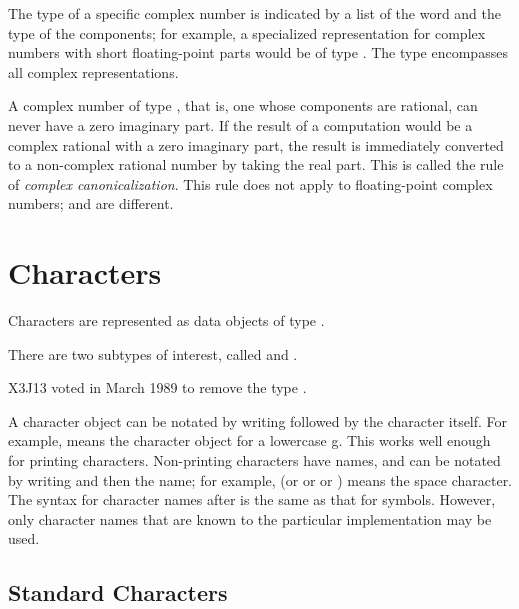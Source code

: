 {The type of a specific complex number is indicated by a list
of the word  and the type of the components; for example,
a specialized representation for complex numbers with short floating-point
parts would be of type .  The type 
encompasses all complex representations.

A complex number of type , that is, one whose
components are rational, can never have a zero imaginary part.
If the result of a computation would be a complex rational
with a zero imaginary part, the result is immediately
converted to a non-complex rational number by taking the
real part.  This is called the rule of {\it complex canonicalization}.
This rule does not apply to floating-point complex numbers;
 and  are different.

\goodbreak

\section{Characters}

Characters are represented as data objects of type .
\begin{obsolete}
There are two subtypes of interest,
called  and .
\end{obsolete}
\begin{newer}
X3J13 voted in March 1989  to remove the type .
\end{newer}

A character object can be notated by writing \cd{\#{\Xbackslash}} followed
by the character itself.  For example,  means the character
object for a lowercase g.  This works well enough for printing
characters.  Non-printing characters have names, and can be notated
by writing \cd{\#{\Xbackslash}} and then the name; for example, 
(or  or  or )
means the space character.  The syntax for character names after \cd{\#{\Xbackslash}}
is the same as that for symbols.  However, only character names
that are known to the particular implementation may be used.

\subsection{Standard Characters}

}
